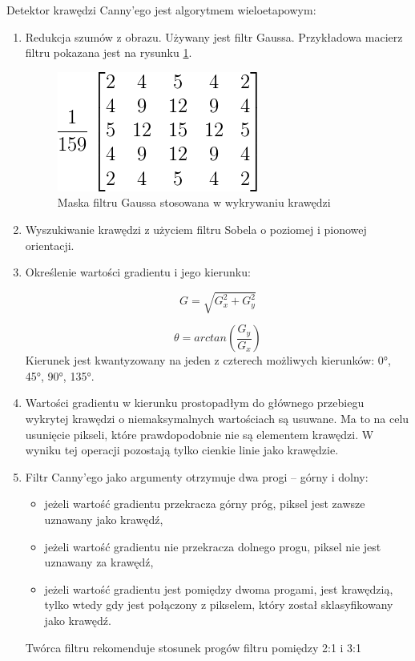 Detektor krawędzi Canny'ego jest algorytmem wieloetapowym:
\begin{enumerate}
\item Redukcja szumów z obrazu. Używany jest filtr Gaussa. Przykładowa macierz filtru pokazana jest na rysunku \ref{fig:canny_gauss}. %
\begin{figure}[h]
\centering
\includegraphics[scale=0.8]{img/canny_gauss.png}
\caption{Maska filtru Gaussa stosowana w wykrywaniu krawędzi}
\label{fig:canny_gauss}
\end{figure}
\item Wyszukiwanie krawędzi z użyciem filtru Sobela o poziomej i pionowej orientacji.
\item Określenie wartości gradientu i jego kierunku:

\begin{equation}
G=\sqrt{G_x^2+G_y^2}
\end{equation}

\begin{equation}
\theta=arctan(\frac{G_y}{G_x})
\end{equation}
Kierunek jest kwantyzowany na jeden z czterech możliwych kierunków: \ang{0}, \ang{45}, \ang{90}, \ang{135}.

\item Wartości gradientu w kierunku prostopadłym do głównego przebiegu wykrytej krawędzi o niemaksymalnych wartościach są usuwane. %
Ma to na celu usunięcie pikseli, które prawdopodobnie nie są elementem krawędzi. 
W wyniku tej operacji pozostają tylko cienkie linie jako krawędzie.

\item Filtr Canny'ego jako argumenty otrzymuje dwa progi -- górny i dolny:
\begin{itemize}
\item jeżeli wartość gradientu przekracza górny próg, piksel jest zawsze uznawany jako krawędź,
\item jeżeli wartość gradientu nie przekracza dolnego progu, piksel nie jest uznawany za krawędź,
\item jeżeli wartość gradientu jest pomiędzy dwoma progami, jest krawędzią, tylko wtedy gdy jest połączony z pikselem, który został sklasyfikowany jako krawędź.
\end{itemize}
Twórca filtru rekomenduje stosunek progów filtru pomiędzy 2:1 i 3:1
\end{enumerate}